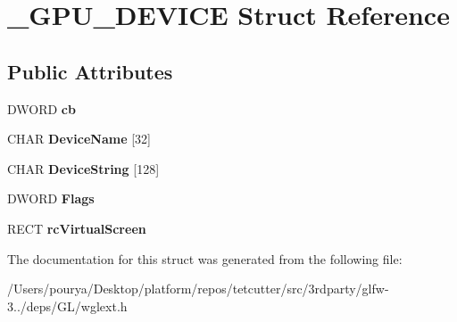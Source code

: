 \hypertarget{struct__GPU__DEVICE}{}\section{\+\_\+\+G\+P\+U\+\_\+\+D\+E\+V\+I\+C\+E Struct Reference}
\label{struct__GPU__DEVICE}
\subsection*{Public Attributes}
\begin{DoxyCompactItemize}
\item 
\hypertarget{struct__GPU__DEVICE_afcb22f16ba9e526610489ff56ab78ddb}{}D\+W\+O\+R\+D {\bfseries cb}\label{struct__GPU__DEVICE_afcb22f16ba9e526610489ff56ab78ddb}

\item 
\hypertarget{struct__GPU__DEVICE_a604bfab61f1a2c5d1e635837d369ba14}{}C\+H\+A\+R {\bfseries Device\+Name} \mbox{[}32\mbox{]}\label{struct__GPU__DEVICE_a604bfab61f1a2c5d1e635837d369ba14}

\item 
\hypertarget{struct__GPU__DEVICE_aff8b7920ccc85afcd6f325da6cdb0b73}{}C\+H\+A\+R {\bfseries Device\+String} \mbox{[}128\mbox{]}\label{struct__GPU__DEVICE_aff8b7920ccc85afcd6f325da6cdb0b73}

\item 
\hypertarget{struct__GPU__DEVICE_a008db9d0f5fc13a5160805f40465f14a}{}D\+W\+O\+R\+D {\bfseries Flags}\label{struct__GPU__DEVICE_a008db9d0f5fc13a5160805f40465f14a}

\item 
\hypertarget{struct__GPU__DEVICE_aeb573bbeb3b6c589246720ef259b9a27}{}R\+E\+C\+T {\bfseries rc\+Virtual\+Screen}\label{struct__GPU__DEVICE_aeb573bbeb3b6c589246720ef259b9a27}

\end{DoxyCompactItemize}


The documentation for this struct was generated from the following file\+:\begin{DoxyCompactItemize}
\item 
/\+Users/pourya/\+Desktop/platform/repos/tetcutter/src/3rdparty/glfw-\/3../deps/\+G\+L/wglext.\+h\end{DoxyCompactItemize}

